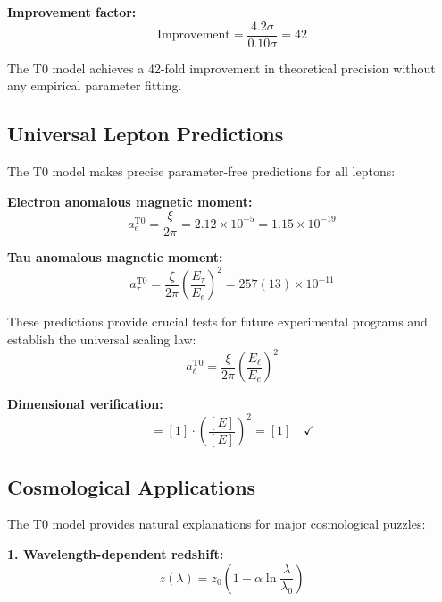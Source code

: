 \documentclass[12pt,a4paper]{report}
\begin{document}
\textbf{Improvement factor:}
\begin{equation}
	\text{Improvement} = \frac{4.2\sigma}{0.10\sigma} = 42
\end{equation}

The T0 model achieves a 42-fold improvement in theoretical precision without any empirical parameter fitting.

\subsection{Universal Lepton Predictions}
\label{subsec:universal_lepton_predictions}

The T0 model makes precise parameter-free predictions for all leptons:

\textbf{Electron anomalous magnetic moment:}
\begin{equation}
	a_e^{\text{T0}} = \frac{\xi}{2\pi} = 2.12 \times 10^{-5} = 1.15 \times 10^{-19}
\end{equation}

\textbf{Tau anomalous magnetic moment:}
\begin{equation}
	a_\tau^{\text{T0}} = \frac{\xi}{2\pi} \left(\frac{E_\tau}{E_e}\right)^2 = 257(13) \times 10^{-11}
\end{equation}

These predictions provide crucial tests for future experimental programs and establish the universal scaling law:
\begin{equation}
	a_\ell^{\text{T0}} = \frac{\xi}{2\pi} \left(\frac{E_\ell}{E_e}\right)^2
\end{equation}

\textbf{Dimensional verification:}
\begin{equation}
	[a_\ell] = [1] \cdot \left(\frac{[E]}{[E]}\right)^2 = [1] \quad \checkmark
\end{equation}

\subsection{Cosmological Applications}
\label{subsec:cosmological_applications}

The T0 model provides natural explanations for major cosmological puzzles:

\textbf{1. Wavelength-dependent redshift:}
\begin{equation}
	z(\lambda) = z_0\left(1 - \alpha \ln\frac{\lambda}{\lambda_0}\right)
\end{equation}
\end{document}
